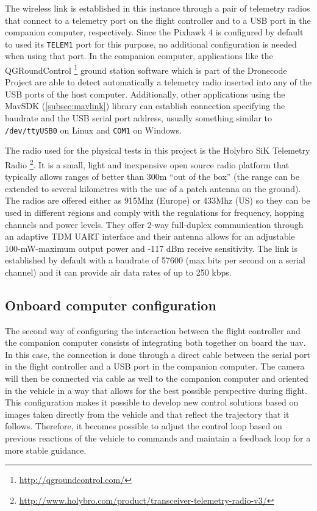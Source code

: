 The wireless link is established in this instance through a pair of telemetry radios that connect to a telemetry port on the flight controller and to a USB port in the companion computer, respectively.
Since the Pixhawk 4 is configured by default to used its \texttt{TELEM1} port for this purpose, no additional configuration is needed when using that port.
In the companion computer, applications like the QGRoundControl \footnote{\url{http://qgroundcontrol.com/}} ground station software which is part of the Dronecode Project are able to detect automatically a telemetry radio inserted into any of the USB ports of the host computer.
Additionally, other applications using the MavSDK (\ref{subsec:mavlink}) library can establish connection specifying the baudrate and the USB serial port address, usually something similar to \texttt{/dev/ttyUSB0} on Linux and \texttt{COM1} on Windows.

The radio used for the physical tests in this project is the Holybro SiK Telemetry Radio \footnote{\url{http://www.holybro.com/product/transceiver-telemetry-radio-v3/}}.
It is a small, light and inexpensive open source radio platform that typically allows ranges of better than 300m “out of the box” (the range can be extended to several kilometres with the use of a patch antenna on the ground).
The radios are offered either as 915Mhz (Europe) or 433Mhz (US) so they can be used in different regions and comply with the regulations for frequency, hopping channels and power levels.
They offer 2-way full-duplex communication through an adaptive TDM UART interface and their antenna allows for an adjustable 100-mW-maximum output power and -117 dBm receive sensitivity.
The link is established by default with a baudrate of 57600 (max bits per second on a serial channel) and it can provide air data rates of up to 250 kbps.


\subsection{Onboard computer configuration}
\label{subsec:onboard}

The second way of configuring the interaction between the flight controller and the companion computer consists of integrating both together on board the \gls{uav}.
In this case, the connection is done through a direct cable between the serial port in the flight controller and a USB port in the companion computer.
The camera will then be connected via cable as well to the companion computer and oriented in the vehicle in a way that allows for the best possible perspective during flight.
This configuration makes it possible to develop new control solutions based on images taken directly from the vehicle and that reflect the trajectory that it follows.
Therefore, it becomes possible to adjust the control loop based on previous reactions of the vehicle to commands and maintain a feedback loop for a more stable guidance.

